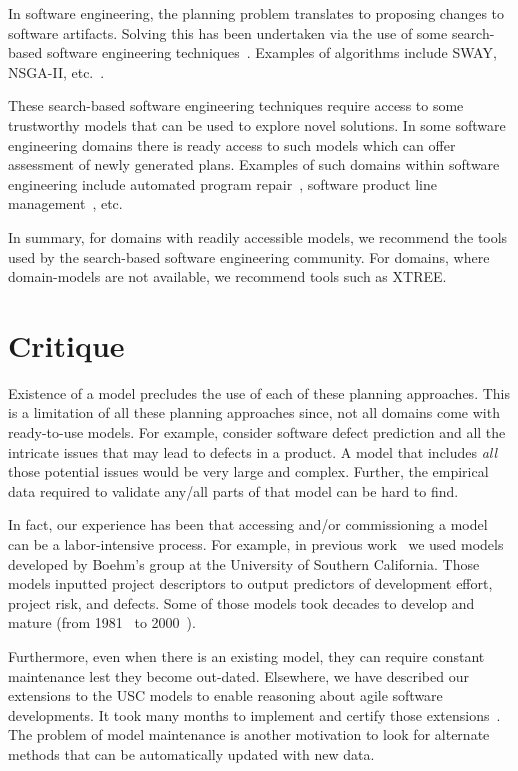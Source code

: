 \documentclass[sigconf, proceedings, 9pt]{acmart}
\begin{document}
In software engineering, the planning problem translates 
to proposing changes to software artifacts. Solving this has been undertaken 
via the use of some search-based software engineering 
techniques~\cite{Harman2009}. Examples of algorithms include SWAY, NSGA-II, 
etc.~\cite{nair2016accidental,deb00a}.

These search-based software engineering techniques require access to some 
trustworthy models that can be used to explore novel solutions. In some 
software engineering domains there is ready access to such models which can 
offer assessment of newly generated plans. Examples of such domains within 
software engineering include automated program repair~\cite{Weimer2009, 
LeGoues2015}, software product line management~\cite{sayyad13, henard15}, etc.

In summary, for domains with readily accessible models, we recommend
the tools used by the search-based software engineering community. For domains, 
where domain-models are not available, we recommend tools such as XTREE. 

\section{Critique}
Existence of a model precludes the use of each of these planning approaches. 
This is a limitation of all these planning approaches since, not all domains 
come with ready-to-use models. For example, consider software defect prediction 
and all the intricate issues that may lead to defects in a product. A model 
that includes {\em all} those potential issues would be very large and complex. 
Further, the empirical data required to validate any/all parts of that model 
can be hard to find.

In fact, our experience has been that accessing and/or commissioning a model 
can be a labor-intensive process.
For  example, in previous work~\cite{me07f} we used models developed by Boehm's 
group at the University of Southern California.
Those models inputted project descriptors to output predictors of development 
effort, project risk, and defects.
Some of those models took decades to develop and mature (from 
1981~\cite{boehm81} to 2000~\cite{boehm00b}). 



Furthermore, even when there is an existing model, they can require constant  
maintenance lest they become out-dated. Elsewhere, we have described our 
extensions to the USC models to enable reasoning about agile software 
developments. It took many months to implement and certify those 
extensions~\cite{me09j}. The problem of model maintenance is another 
motivation to look for alternate methods that can be automatically updated with 
new data.
\end{document}
